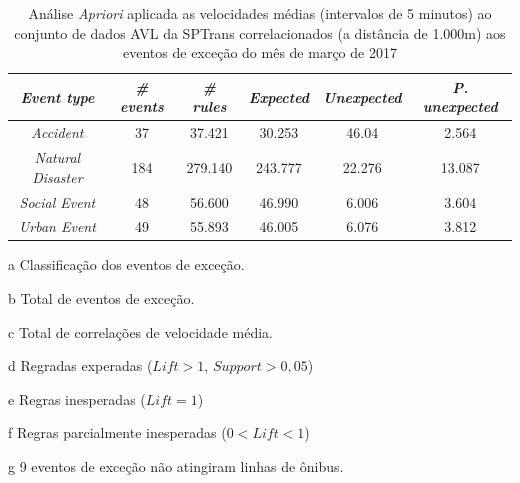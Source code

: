 \documentclass[
	12pt,				%
	oneside,			%
	a4paper,			%
	english,			%
	brazil				%
	]{abntex2ppgsi}
\begin{document}
{{\begin{apendicesenv}
\begin{table}[!htb]
\centering
\begin{threeparttable}
\caption {Análise \textit{Apriori} aplicada as velocidades médias (intervalos de 5 minutos) ao conjunto de dados AVL da SPTrans correlacionados (a distância de 1.000m) aos eventos de exceção do mês de março de 2017}
\label {tab:aprioriFull}
\begin{tabular}{c|c|c|c|c|c}
\hline
\textbf{\textit{Event type}}\tnote{a} & \textbf{\textit{\# events}}\tnote{b} & \textit{\textbf{\# rules}}\tnote{c} & \textbf{\textit{Expected}}\tnote{d} & \textbf{\textit{Unexpected}}\tnote{e} & \textbf{\textit{P. unexpected}}\tnote{f}   \\
\hline
\textit{Accident} & 37 & 37.421 & 30.253 & 46.04 & 2.564 \\
\textit{Natural Disaster} & 184 & 279.140 & 243.777 & 22.276 & 13.087 \\
\textit{Social Event} & 48 & 56.600 & 46.990 & 6.006 & 3.604 \\
\textit{Urban Event} & 49 & 55.893 & 46.005 & 6.076 & 3.812 \\
\hline
\end{tabular}
\begin{tablenotes}
            \item[a] Classificação dos eventos de exceção.
            \item[b] Total de eventos de exceção.
            \item[c] Total de correlações de velocidade média.
            \item[d] Regradas experadas ($Lift > 1$, $Support > 0,05$)
            \item[e] Regras inesperadas ($Lift = 1$)
            \item[f] Regras parcialmente inesperadas ($0 < Lift < 1$)
            \item[g] 9 eventos de exceção não atingiram linhas de ônibus.
        \end{tablenotes}
\end{threeparttable}
\end{table}


\end{apendicesenv}}}
\end{document}
